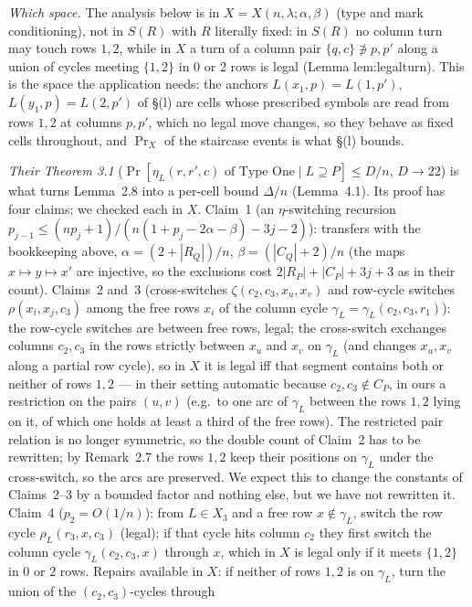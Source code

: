 \emph{Which space.}  The analysis below is in $X=X(n,\lambda;\alpha,\beta)$
(type and mark conditioning), not in $S(R)$ with $R$ literally fixed:
in $S(R)$ no column turn may touch rows $1,2$, while in $X$ a turn of a
column pair $\{q,c\}\not\ni p,p'$ along a union of cycles meeting
$\{1,2\}$ in $0$ or $2$ rows is legal (Lemma lem:legalturn).  This is
the space the application needs: the anchors
$L(x_1,p)=L(1,p')$, $L(y_1,p)=L(2,p')$ of \S(l) are cells whose
prescribed symbols are read from rows $1,2$ at columns $p,p'$, which no
legal move changes, so they behave as fixed cells throughout, and
$\Pr_X$ of the staircase events is what \S(l) bounds.

\emph{Their Theorem 3.1} ($\Pr[\eta_L(r,r',c)\text{ of Type One}\mid L\supseteq P]\le D/n$,
$D\to22$) is what turns Lemma~2.8 into a per-cell bound $\Delta/n$
(Lemma~4.1).  Its proof has four claims; we checked each in $X$.
Claim~1 (an $\eta$-switching recursion
$p_{j-1}\le(np_j+1)/(n(1+p_j-2\alpha-\beta)-3j-2)$): transfers with
the bookkeeping above, $\alpha=(2+|R_Q|)/n$, $\beta=(|C_Q|+2)/n$ (the
maps $x\mapsto y\mapsto x'$ are injective, so the exclusions cost
$2|R_P|+|C_P|+3j+3$ as in their count).  Claims~2 and~3
(cross-switches $\zeta(c_2,c_3,x_u,x_v)$ and row-cycle switches
$\rho(x_i,x_j,c_3)$ among the free rows $x_i$ of the column cycle
$\gamma_L=\gamma_L(c_2,c_3,r_1)$): the row-cycle switches are between
free rows, legal; the cross-switch exchanges columns $c_2,c_3$ in the
rows strictly between $x_u$ and $x_v$ on $\gamma_L$ (and changes
$x_u,x_v$ along a partial row cycle), so in $X$ it is legal iff that
segment contains both or neither of rows $1,2$ --- in their setting
automatic because $c_2,c_3\notin C_P$, in ours a restriction on the
pairs $(u,v)$ (e.g.\ to one arc of $\gamma_L$ between the rows $1,2$
lying on it, of which one holds at least a third of the free rows).
The restricted pair relation is no longer symmetric, so the double
count of Claim~2 has to be rewritten; by Remark~2.7 the rows $1,2$ keep
their positions on $\gamma_L$ under the cross-switch, so the arcs are
preserved.  We expect this to change the constants of Claims~2--3 by
a bounded factor and nothing else, but we have not rewritten it.
Claim~4 ($p_2=O(1/n)$): from $L\in X_3$ and a free row $x\notin\gamma_L$,
switch the row cycle $\rho_L(r_3,x,c_3)$ (legal); if that cycle hits
column $c_2$ they first switch the column cycle $\gamma_L(c_2,c_3,x)$
through $x$, which in $X$ is legal only if it meets $\{1,2\}$ in $0$
or $2$ rows.  Repairs available in $X$: if neither of rows $1,2$ is
on $\gamma_L$, turn the union of the $(c_2,c_3)$-cycles through

